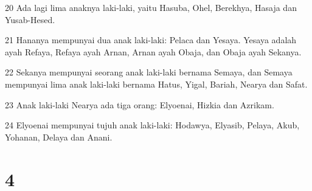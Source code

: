 \par 20 Ada lagi lima anaknya laki-laki, yaitu Hasuba, Ohel, Berekhya, Hasaja dan Yusab-Hesed.
\par 21 Hananya mempunyai dua anak laki-laki: Pelaca dan Yesaya. Yesaya adalah ayah Refaya, Refaya ayah Arnan, Arnan ayah Obaja, dan Obaja ayah Sekanya.
\par 22 Sekanya mempunyai seorang anak laki-laki bernama Semaya, dan Semaya mempunyai lima anak laki-laki bernama Hatus, Yigal, Bariah, Nearya dan Safat.
\par 23 Anak laki-laki Nearya ada tiga orang: Elyoenai, Hizkia dan Azrikam.
\par 24 Elyoenai mempunyai tujuh anak laki-laki: Hodawya, Elyasib, Pelaya, Akub, Yohanan, Delaya dan Anani.

\chapter{4}

